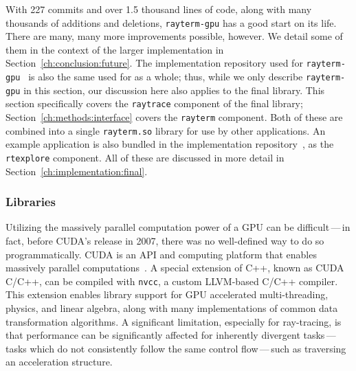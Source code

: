 With 227 commits and over 1.5 thousand lines of code, along with many thousands of additions and deletions, \texttt{rayterm-gpu} has a good start on its life.
There are many, many more improvements possible, however.
We detail some of them in the context of the larger \name{} implementation in Section~\ref{ch:conclusion:future}.
The implementation repository used for \texttt{rayterm-gpu}~\cite{raytermGpuImpl} is also the same used for \name{} as a whole; thus, while we only describe \texttt{rayterm-gpu} in this section, our discussion here also applies to the final \name{} library.
This section specifically covers the \texttt{raytrace} component of the final \name{} library; Section~\ref{ch:methods:interface} covers the \texttt{rayterm} component.
Both of these are combined into a single \texttt{rayterm.so} library for use by other applications.
An example application is also bundled in the implementation repository~\cite{raytermGpuImpl}, as the \texttt{rtexplore} component.
All of these are discussed in more detail in Section~\ref{ch:implementation:final}.

\subsubsection{Libraries}
\label{ch:methods:renderer:parallel:libraries}

Utilizing the massively parallel computation power of a GPU can be difficult\,---\,in fact, before CUDA's release in 2007, there was no well-defined way to do so programmatically.
CUDA is an API and computing platform that enables massively parallel computations~\cite{nvidia2011cuda}.
A special extension of C++, known as CUDA C/C++, can be compiled with \texttt{nvcc}, a custom LLVM-based C/C++ compiler.
This extension enables library support for GPU accelerated multi-threading, physics, and linear algebra, along with many implementations of common data transformation algorithms.
A significant limitation, especially for ray-tracing, is that performance can be significantly affected for inherently divergent tasks\,---\,tasks which do not consistently follow the same control flow\,---\,such as traversing an acceleration structure.

